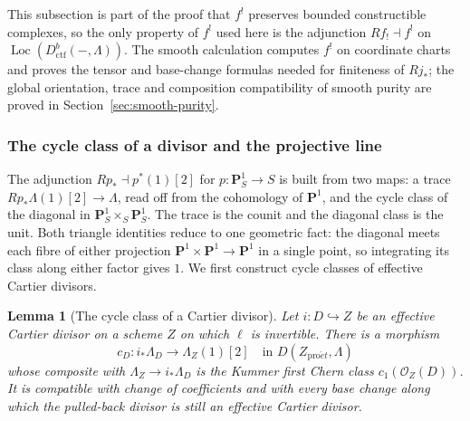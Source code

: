 \documentclass[11pt,a4paper]{article}
\numberwithin{equation}{section}
\newtheorem{lemma}[theorem]{Lemma}
\theoremstyle{definition}
\theoremstyle{remark}
\newcommand{\Loc}{\operatorname{Loc}}
\newcommand{\proet}{\mathrm{pro}\acute{e}t}
\newcommand{\Dctf}{D^b_{\mathrm{ctf}}}
\begin{document}
This subsection is part of the proof that $f^!$ preserves bounded
constructible complexes, so the only property of $f^!$ used here is the
adjunction $Rf_!\dashv f^!$ on $\Loc(\Dctf(-,\Lambda))$. The smooth
calculation computes $f^!$ on coordinate charts and proves
the tensor and base-change formulas needed for finiteness of $Rj_*$;
the global orientation, trace and composition compatibility of smooth
purity are proved in Section~\ref{sec:smooth-purity}.

\subsubsection{The cycle class of a divisor and the projective line}

The adjunction \(Rp_*\dashv p^*(1)[2]\) for
\(p:\mathbf P^1_S\to S\) is built from two maps: a trace
\(Rp_*\Lambda(1)[2]\to\Lambda\), read off from the cohomology of
\(\mathbf P^1\), and the cycle class of the diagonal in
\(\mathbf P^1_S\times_S\mathbf P^1_S\). The trace is the counit and the
diagonal class is the unit. Both triangle identities reduce to one
geometric fact: the diagonal meets each fibre of either projection
\(\mathbf P^1\times\mathbf P^1\to\mathbf P^1\) in a single point, so
integrating its class along either factor gives \(1\). We first
construct cycle classes of effective Cartier divisors.

\begin{lemma}[The cycle class of a Cartier divisor]
\label{b:lem:geo-cartier}
Let \(i:D\hookrightarrow Z\) be an effective Cartier divisor on a
scheme \(Z\) on which \(\ell\) is invertible. There is a morphism
\[
 c_D:i_*\Lambda_D\longrightarrow\Lambda_Z(1)[2]\quad\text{in }D(Z_{\proet},\Lambda)
\]
whose composite with \(\Lambda_Z\to i_*\Lambda_D\) is the Kummer first
Chern class \(c_1(\mathcal O_Z(D))\). It is compatible with change of
coefficients and with every base change along which the pulled-back
divisor is still an effective Cartier divisor.
\end{lemma}
\end{document}
